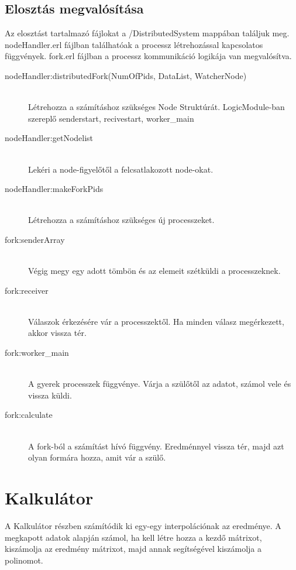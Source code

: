 \subsection{Elosztás megvalósítása}
	Az elosztást tartalmazó fájlokat a /DistributedSystem mappában találjuk meg. nodeHandler.erl fájlban találhatóak a processz létrehozással kapcsolatos függvények. fork.erl fájlban a processz kommunikáció logikája van megvalósítva.
	\begin{description}
		\item[nodeHandler:distributedFork(NumOfPids, DataList, WatcherNode)]
		\hfill \\
		Létrehozza a számításhoz szükséges Node Struktúrát.
		LogicModule-ban szereplő senderstart, recivestart, worker\_main 
		\item[nodeHandler:getNodelist]
		\hfill \\
		Lekéri a node-figyelőtől a felcsatlakozott node-okat.
		\item[nodeHandler:makeForkPids]
		\hfill \\
		Létrehozza a számításhoz szükséges új processzeket.

		\item[fork:senderArray]
		\hfill \\ 
			Végig megy egy adott tömbön és az elemeit szétküldi a processzeknek. 
		\item[fork:receiver]
		\hfill \\
			Válaszok érkezésére vár a processzektől. Ha minden válasz megérkezett, akkor vissza tér.
		\item[fork:worker\_main]
		\hfill \\
			A gyerek processzek függvénye. Várja a szülőtől az adatot, számol vele és vissza küldi.
		\item[fork:calculate]
		\hfill \\ 
			A fork-ból a számítást hívó függvény. Eredménnyel vissza tér, majd azt olyan formára hozza, amit vár a szülő. 
	\end{description}
\section{Kalkulátor}
A Kalkulátor részben számítódik ki egy-egy interpolációnak az eredménye.
A megkapott adatok alapján számol, ha kell létre hozza a kezdő mátrixot, kiszámolja az eredmény mátrixot, majd annak segítségével kiszámolja a polinomot. \newline

